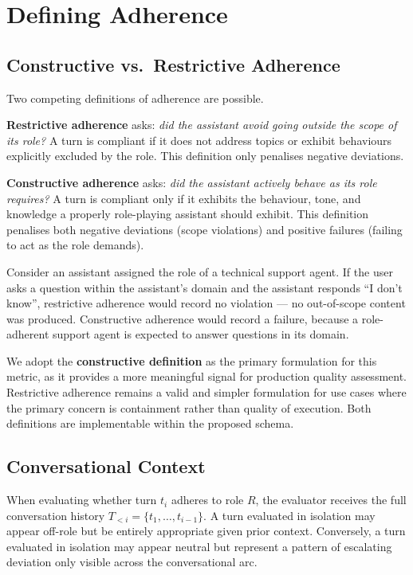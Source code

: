 \documentclass[11pt,a4paper]{article}
\begin{document}
\section{Defining Adherence}
\label{sec:adherence}

\subsection{Constructive vs.\ Restrictive Adherence}

Two competing definitions of adherence are possible.

\textbf{Restrictive adherence} asks: \emph{did the assistant avoid going
outside the scope of its role?} A turn is compliant if it does not address
topics or exhibit behaviours explicitly excluded by the role. This definition
only penalises negative deviations.

\textbf{Constructive adherence} asks: \emph{did the assistant actively behave
as its role requires?} A turn is compliant only if it exhibits the behaviour,
tone, and knowledge a properly role-playing assistant should exhibit. This
definition penalises both negative deviations (scope violations) and positive
failures (failing to act as the role demands).

Consider an assistant assigned the role of a technical support agent. If the
user asks a question within the assistant's domain and the assistant responds
``I don't know'', restrictive adherence would record no violation --- no
out-of-scope content was produced. Constructive adherence would record a
failure, because a role-adherent support agent is expected to answer questions
in its domain.

We adopt the \textbf{constructive definition} as the primary formulation for
this metric, as it provides a more meaningful signal for production quality
assessment. Restrictive adherence remains a valid and simpler formulation for
use cases where the primary concern is containment rather than quality of
execution. Both definitions are implementable within the proposed schema.

\subsection{Conversational Context}

When evaluating whether turn $t_i$ adheres to role $R$, the evaluator receives
the full conversation history $T_{<i} = \{t_1, \ldots, t_{i-1}\}$. A turn
evaluated in isolation may appear off-role but be entirely appropriate given
prior context. Conversely, a turn evaluated in isolation may appear neutral but
represent a pattern of escalating deviation only visible across the
conversational arc.
\end{document}
